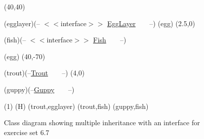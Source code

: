 





\begin {figure}


\Draw

\MinNodeSize(40,40)

\RectNode (egglayer)(-- $<<$interface$>>$
                  \underline {EggLayer}~~~~--)
\MarkLoc(egg)
\MoveToExit(2.5,0)

\RectNode (fish)(-- $<<$interface$>>$
		\underline {Fish}~~~~--)

\MoveToLoc(egg)  \Move(40,-70)

\RectNode (trout)(--\underline {Trout}~~~~--)
\MoveToExit(4,0)

\RectNode (guppy)(--\underline {Guppy}~~~~--)

\ArrowHeads(1) \ArrowSpec(H)
\Edge(trout,egglayer)      
\Edge(trout,fish)      
\Edge(guppy,fish)      

\EndDraw

\caption {Class diagram showing multiple inheritance with an interface
	 for exercise set 6.7}

\label {fig:interfaceEx2}

\end {figure}


